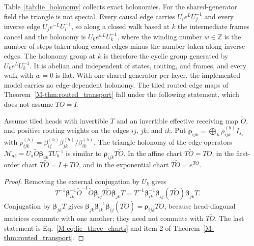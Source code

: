 \documentclass[twoside,11pt]{article}
\begin{document}
Table~\ref{tab:lie_holonomy} collects exact holonomies. For the shared-generator field the triangle is not special. Every causal edge carries $U_ie^{L}U_j^{-1}$ and every inverse edge $U_je^{-L}U_i^{-1}$, so along a closed walk based at $k$ the intermediate frames cancel and the holonomy is $U_ke^{wL}U_k^{-1}$, where the winding number $w\in\mathbb Z$ is the number of steps taken along causal edges minus the number taken along inverse edges. The holonomy group at $k$ is therefore the cyclic group generated by $U_ke^{L}U_k^{-1}$. It is abelian and independent of states, routing, and frames, and every walk with $w=0$ is flat. With one shared generator per layer, the implemented model carries no edge-dependent holonomy. The tiled routed edge maps of Theorem~\ref{M-thm:routed_transport} fall under the following statement, which does not assume $TO=I$.

\begin{proposition}
\label{prop:lie_triangle_spectrum}
Assume tiled heads with invertible $T$ and an invertible effective receiving map $\widetilde O$, and positive routing weights on the edges $ij$, $jk$, and $ik$. Put $\boldsymbol\rho_{ijk}=\bigoplus_h\rho_{ijk}^{(h)}I_{s_h}$ with $\rho_{ijk}^{(h)}=\beta_{ij}^{(h)}\beta_{jk}^{(h)}/\beta_{ik}^{(h)}$. The triangle holonomy of the edge operators $\mathcal M_{ab}=U_a\widetilde O\boldsymbol\beta_{ab}TU_b^{-1}$ is similar to $\boldsymbol\rho_{ijk}T\widetilde O$. In the affine chart $T\widetilde O=TO$, in the first-order chart $T\widetilde O=I+TO$, and in the exponential chart $T\widetilde O=e^{TO}$.
\end{proposition}
\begin{proof}
Removing the external conjugation by $U_k$ gives
\[
T^{-1}\boldsymbol\beta_{ik}^{-1}\widetilde O^{-1}\widetilde O\boldsymbol\beta_{ij}T\widetilde O\boldsymbol\beta_{jk}T=T^{-1}\boldsymbol\beta_{ik}^{-1}\boldsymbol\beta_{ij}(T\widetilde O)\boldsymbol\beta_{jk}T.
\]
Conjugation by $\boldsymbol\beta_{jk}T$ gives $\boldsymbol\beta_{jk}\boldsymbol\beta_{ik}^{-1}\boldsymbol\beta_{ij}(T\widetilde O)=\boldsymbol\rho_{ijk}T\widetilde O$, because head-diagonal matrices commute with one another; they need not commute with $T\widetilde O$. The last statement is Eq.~\eqref{M-eq:lie_three_charts} and item 2 of Theorem~\ref{M-thm:routed_transport}.
\end{proof}
\end{document}
